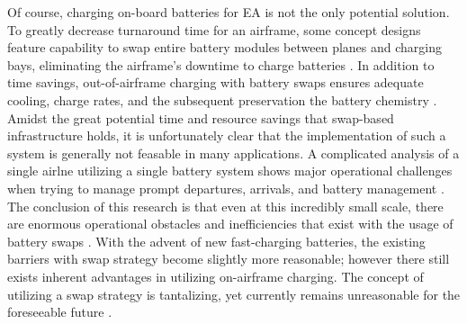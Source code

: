 \documentclass[../main.tex]{subfiles}
\begin{document}
Of course, charging on-board batteries for EA is not the only potential solution. To greatly decrease turnaround time for an airframe, some concept designs feature capability to swap entire battery modules between planes and charging bays, eliminating the airframe's downtime to charge batteries \cite{ref31}. In addition to time savings, out-of-airframe charging with battery swaps ensures adequate cooling, charge rates, and the subsequent preservation the battery chemistry \cite{ref41}. Amidst the great potential time and resource savings that swap-based infrastructure holds, it is unfortunately clear that the implementation of such a system is generally not feasable in many applications. A complicated analysis of a single airlne utilizing a single battery system shows major operational challenges when trying to manage prompt departures, arrivals, and battery management \cite{ref31}. The conclusion of this research is that even at this incredibly small scale, there are enormous operational obstacles and inefficiencies that exist with the usage of battery swaps \cite{ref31}. With the advent of new fast-charging batteries, the existing barriers with swap strategy become slightly more reasonable; however there still exists inherent advantages in utilizing on-airframe charging.  The concept of utilizing a swap strategy is tantalizing, yet currently remains unreasonable for the foreseeable future \cite{ref31}.\par
\end{document}
